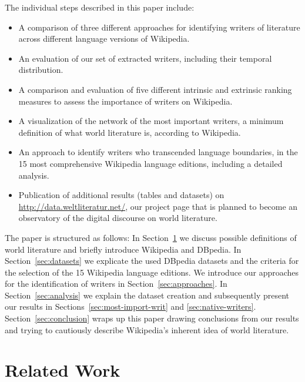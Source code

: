 \documentclass[a4paper,12pt]{scrartcl}
\begin{document}
The individual steps described in this paper include:
\begin{itemize} %
\item A comparison of three different approaches for identifying
  writers of literature across different language versions of Wikipedia.
\item An evaluation of our set of extracted writers, including
 their temporal distribution.
\item A comparison and evaluation of five different intrinsic and
  extrinsic ranking measures to assess the importance of writers on
  Wikipedia.
\item A visualization of the network of the most important writers, a
  minimum definition of what world literature is, according to
  Wikipedia.
\item An approach to identify writers who transcended language
  boundaries, in the 15 most comprehensive Wikipedia language
  editions, including a detailed analysis.
\item Publication of additional results (tables and datasets) on
  \url{http://data.weltliteratur.net/}, our project page that is planned
  to become an observatory of the digital discourse on world
  literature.
\end{itemize}

The paper is structured as follows: In Section~\ref{related-work} we
discuss possible definitions of world literature and briefly introduce
Wikipedia and DBpedia.
In Section~\ref{sec:datasets} we explicate the used DBpedia datasets
and the criteria for the selection of the 15 Wikipedia language
editions. We introduce our approaches for the identification of
writers in Section~\ref{sec:approaches}.
In Section~\ref{sec:analysis} we explain the dataset creation and
subsequently present our results in
Sections~\ref{sec:most-import-writ} and
\ref{sec:native-writers}. Section~\ref{sec:conclusion} wraps up
this paper drawing conclusions from our results and trying to
cautiously describe Wikipedia's inherent idea of world literature.


\section{Related Work}\label{related-work}
\end{document}
